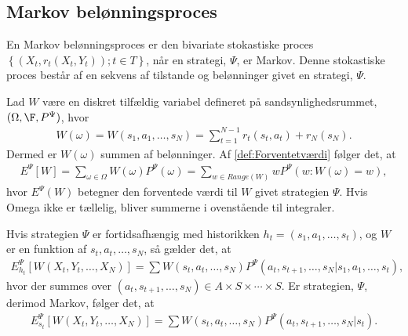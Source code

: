 \subsection{Markov belønningsproces}
En Markov belønningsproces er den bivariate stokastiske proces $\left\{\left(X_t, r_t(X_t, Y_t)\right); t \in T\right\}$, når en strategi, $\Psi$, er Markov. Denne stokastiske proces består af en sekvens af tilstande og belønninger givet en strategi, $\Psi$. 

Lad $W$ være en diskret tilfældig variabel defineret på sandsynlighedsrummet, $(\Omega, \F, P^{\Psi})$, hvor
\begin{align*}
    W(\omega)=W(s_1 , a_1 , \dots , s_N) = \sum_{t=1}^{N-1} r_t(s_t,a_t) + r_N(s_N).
\end{align*}
Dermed er $W(\omega)$ summen af belønninger. Af \autoref{def:Forventetværdi} følger det, at
\begin{align*}
    E^\Psi [W] = \sum_{\omega \in \Omega} W(\omega)P^\Psi\left(\omega\right) = \sum_{w \in Range(W)} w P^\Psi \left(w: W(\omega) = w\right), 
\end{align*}
hvor $E^\Psi(W)$ betegner den forventede værdi til $W$ givet strategien $\Psi$. Hvis Omega ikke er tællelig, bliver summerne i ovenstående til integraler. 

Hvis strategien $\Psi$ er fortidsafhængig med historikken $h_t=(s_1, a_1 , \dots , s_t)$, og $W$ er en funktion af $s_t, a_t,\dots, s_N$, så gælder det, at
\begin{align}\label{eq:forventet_belønning_fortidsafhængig}
    E_{h_t}^\Psi \left[W(X_t , Y_t , \dots , X_N) \right] = \sum W(s_t , a_t , \dots , s_N) P^\Psi (a_t , s_{t+1} , \dots , s_N | s_1 , a_1 , \dots , s_t),
\end{align}
hvor der summes over $(a_t , s_{t+1} , \dots , s_N) \in A \times S \times \cdots \times S$. Er strategien, $\Psi$, derimod Markov, følger det, at
\begin{align*}
     E_{s_t}^\Psi \left[W(X_t , Y_t , \dots , X_N) \right] = \sum W(s_t , a_t , \dots , s_N) P^\Psi (a_t , s_{t+1} , \dots , s_N | s_t).
\end{align*}
 

